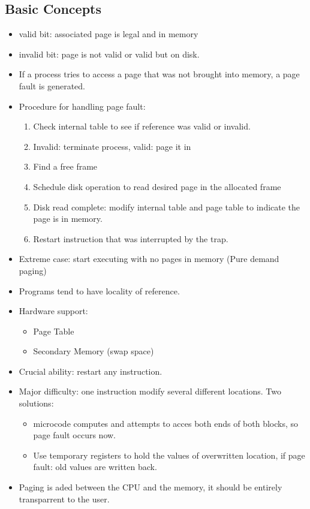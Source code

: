 \documentclass[10pt]{report}
\begin{document}
		\subsection{Basic Concepts}
			\begin{itemize}
				\item valid bit: associated page is legal and in memory
				\item invalid bit: page is not valid or valid but on disk.
				\item If a process tries to access a page that was not brought into memory, a page fault is generated.
				\item Procedure for handling page fault:
				\begin{enumerate}
					\item Check internal table to see if reference was valid or invalid.
					\item Invalid: terminate process, valid: page it in
					\item Find a free frame
					\item Schedule disk operation to read desired page in the allocated frame
					\item Disk read complete: modify internal table and page table to indicate the page is in memory.
					\item Restart instruction that was interrupted by the trap.
				\end{enumerate}
				\item Extreme case: start executing with no pages in memory (Pure demand paging)
				\item Programs tend to have locality of reference.
				\item Hardware support:
				\begin{itemize}
					\item Page Table
					\item Secondary Memory (swap space)
				\end{itemize}
				\item Crucial ability: restart any instruction.
				\item Major difficulty: one instruction modify several different locations. Two solutions:
				\begin{itemize}
					\item microcode computes and attempts to acces both ends of both blocks, so page fault occurs now.
					\item Use temporary registers to hold the values of overwritten location, if page fault: old values are written back.
				\end{itemize}
				\item Paging is aded between the CPU and the memory, it should be entirely transparrent to the user.
			\end{itemize}
\end{document}
